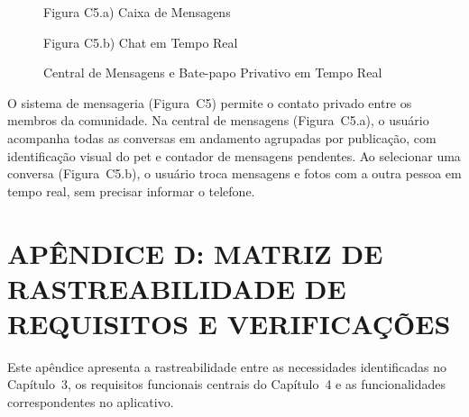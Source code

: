 \begin{figure}[H]
    \centering
    \caption{Central de Mensagens e Bate-papo Privativo em Tempo Real}
    \label{fig:manual_mensagens_chat}
    \vspace{0.15cm}
    \begin{minipage}[t]{0.48\textwidth}
        \centering
        \par\vspace{0.12cm}
        {\small Figura C5.a) Caixa de Mensagens}
    \end{minipage}
    \hfill
    \begin{minipage}[t]{0.48\textwidth}
        \centering
        \par\vspace{0.12cm}
        {\small Figura C5.b) Chat em Tempo Real}
    \end{minipage}
    \par\vspace{0.1cm}
\end{figure}

O sistema de mensageria (Figura~C5) permite o contato privado entre os membros da comunidade. Na central de mensagens (Figura~C5.a), o usuário acompanha todas as conversas em andamento agrupadas por publicação, com identificação visual do pet e contador de mensagens pendentes. Ao selecionar uma conversa (Figura~C5.b), o usuário troca mensagens e fotos com a outra pessoa em tempo real, sem precisar informar o telefone.

\clearpage

\clearpage

\section*{APÊNDICE D: MATRIZ DE RASTREABILIDADE DE REQUISITOS E VERIFICAÇÕES}
{}

Este apêndice apresenta a rastreabilidade entre as necessidades identificadas no Capítulo~3, os requisitos funcionais centrais do Capítulo~4 e as funcionalidades correspondentes no aplicativo.

